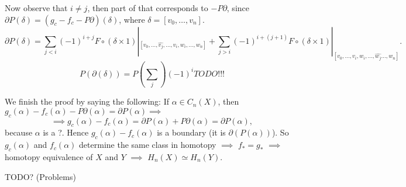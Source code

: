 \documentclass[12pt]{article}					%
\begin{document}
\begin{tvrzeni}
\begin{dukazin}
		Now observe that $i ≠ j$, then part of that corresponds to $-P\partial$, since $\partial P(δ) = (g_c - f_c - P\partial)(δ)$, where $δ = [v_0, …, v_n]$.
		$$ \partial P(δ) = \sum_{j < i} (-1)^{i + j} F ∘ (δ \times 1)|_{[v_0, …, \hat{v_j}, …, v_i, w_i, …, w_n]} + \sum_{j > i} (-1)^{i + (j + 1)} F ∘ (δ \times 1)|_{[v_0, …, v_i, w_i, …, \hat{w_j} …, w_n]}. $$
		$$ P(\partial(δ)) = P(\sum_j)(-1)^i TODO!!! $$

		We finish the proof by saying the following: If $α \in C_n(X)$, then $g_c(α) - f_c(α) - P\partial(α) = \partial P(α) \implies$
		$$ \implies g_c(α) - f_c(α) = \partial P(α) + P \partial(α) = \partial P(α), $$
		because $α$ is a ?. Hence $g_c(α) - f_c(α)$ is a boundary (it is $\partial(P(α))$). So $g_c(α)$ and $f_c(α)$ determine the same class in homotopy $\implies$ $f_* = g_*$ $\implies$ homotopy equivalence of $X$ and $Y$ $\implies$ $H_n(X) \simeq H_n(Y)$.
	\end{dukazin}
\end{tvrzeni}


TODO? (Problems)
\end{document}
